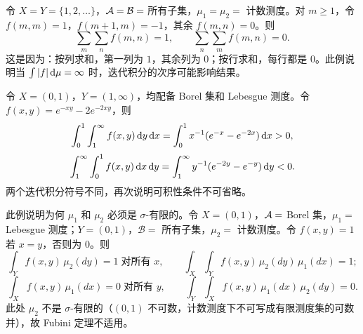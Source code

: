 \begin{example}\label{example-1-7-5}
    令 $X = Y = \{1, 2, \ldots\}$，$\mathcal{A} = \mathcal{B} = $ 所有子集，$\mu_1 = \mu_2 = $ 计数测度。对 $m \ge 1$，令 $f(m,m) = 1$，$f(m+1,m) = -1$，其余 $f(m,n) = 0$。则
    \[
        \sum_m \sum_n f(m,n) = 1, \qquad \sum_n \sum_m f(m,n) = 0.
    \]
    这是因为：按列求和，第一列为 $1$，其余列为 $0$；按行求和，每行都是 $0$。此例说明当 $\int |f| \,\mathrm{d}\mu = \infty$ 时，迭代积分的次序可能影响结果。
\end{example}

\begin{example}\label{example-1-7-6}
    令 $X = (0,1)$，$Y = (1, \infty)$，均配备 Borel 集和 Lebesgue 测度。令 $f(x,y) = e^{-xy} - 2e^{-2xy}$，则
    \[
        \int_0^1 \int_1^\infty f(x,y) \,\mathrm{d} y \,\mathrm{d} x = \int_0^1 x^{-1}(e^{-x} - e^{-2x}) \,\mathrm{d} x > 0,
    \]
    \[
        \int_1^\infty \int_0^1 f(x,y) \,\mathrm{d} x \,\mathrm{d} y = \int_1^\infty y^{-1}(e^{-2y} - e^{-y}) \,\mathrm{d} y < 0.
    \]
    两个迭代积分符号不同，再次说明可积性条件不可省略。
\end{example}

\begin{example}\label{example-1-7-7}
    此例说明为何 $\mu_1$ 和 $\mu_2$ 必须是 $\sigma$-有限的。令 $X = (0,1)$，$\mathcal{A} = $ Borel 集，$\mu_1 = $ Lebesgue 测度；$Y = (0,1)$，$\mathcal{B} = $ 所有子集，$\mu_2 = $ 计数测度。令 $f(x,y) = 1$ 若 $x = y$，否则为 $0$。则
    \[
        \int_Y f(x,y)\,\mu_2(dy) = 1 \;\text{对所有 $x$}, \qquad \int_X \int_Y f(x,y)\,\mu_2(dy)\,\mu_1(dx) = 1;
    \]
    \[
        \int_X f(x,y)\,\mu_1(dx) = 0 \;\text{对所有 $y$}, \qquad \int_Y \int_X f(x,y)\,\mu_1(dx)\,\mu_2(dy) = 0.
    \]
    此处 $\mu_2$ 不是 $\sigma$-有限的（$(0,1)$ 不可数，计数测度下不可写成有限测度集的可数并），故 Fubini 定理不适用。
\end{example}

\clearpage

